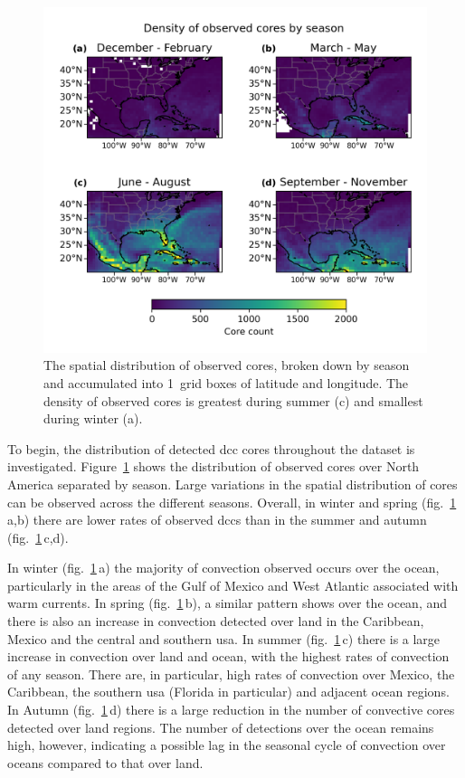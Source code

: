 \begin{figure}[tp]
    \centering
    \includegraphics[width=\textwidth]{figures/chapter2_03.png}
    \caption[
    The spatial distribution of observed cores by season
    ]{
    The spatial distribution of observed cores, broken down by season and accumulated into 1\textdegree\ grid boxes of latitude and longitude. The density of observed cores is greatest during summer (c) and smallest during winter (a).
    }
    \label{fig:core_density_by_season}
\end{figure}

To begin, the distribution of detected \acrshort{dcc} cores throughout the dataset is investigated.
Figure~\ref{fig:core_density_by_season} shows the distribution of observed cores over North America separated by season.
Large variations in the spatial distribution of cores can be observed across the different seasons.
Overall, in winter and spring (fig.~\ref{fig:core_density_by_season}\,a,b) there are lower rates of observed \acrshort{dcc}s than in the summer and autumn (fig.~\ref{fig:core_density_by_season}\,c,d).

In winter (fig.~\ref{fig:core_density_by_season}\,a) the majority of convection observed occurs over the ocean, particularly in the areas of the Gulf of Mexico and West Atlantic associated with warm currents.
In spring (fig.~\ref{fig:core_density_by_season}\,b), a similar pattern shows over the ocean, and there is also an increase in convection detected over land in the Caribbean, Mexico and the central and southern \acrshort{usa}.
In summer (fig.~\ref{fig:core_density_by_season}\,c) there is a large increase in convection over land and ocean, with the highest rates of convection of any season.
There are, in particular, high rates of convection over Mexico, the Caribbean, the southern \acrshort{usa} (Florida in particular) and adjacent ocean regions.
In Autumn (fig.~\ref{fig:core_density_by_season}\,d) there is a large reduction in the number of convective cores detected over land regions.
The number of detections over the ocean remains high, however, indicating a possible lag in the seasonal cycle of convection over oceans compared to that over land.

